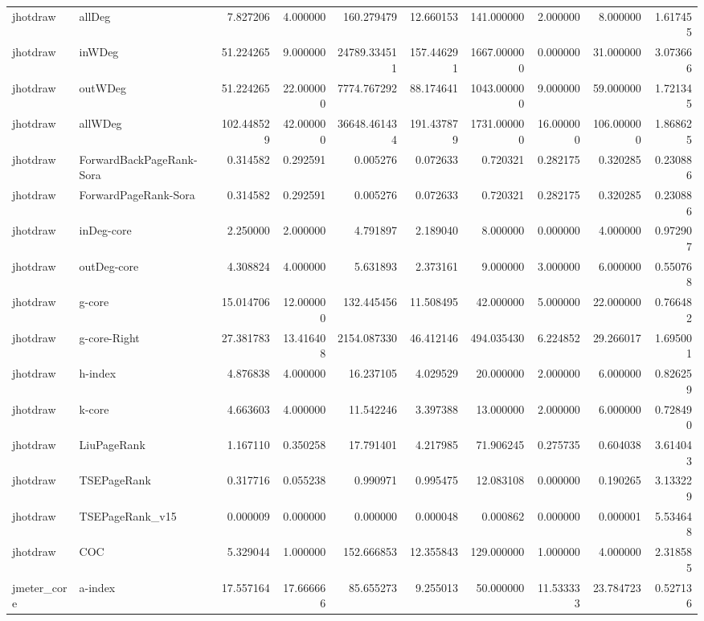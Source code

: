 \begin{tabular}{llrrrrrrrr}
jhotdraw & allDeg & 7.827206 & 4.000000 & 160.279479 & 12.660153 & 141.000000 & 2.000000 & 8.000000 & 1.617455 \\
jhotdraw & inWDeg & 51.224265 & 9.000000 & 24789.334511 & 157.446291 & 1667.000000 & 0.000000 & 31.000000 & 3.073666 \\
jhotdraw & outWDeg & 51.224265 & 22.000000 & 7774.767292 & 88.174641 & 1043.000000 & 9.000000 & 59.000000 & 1.721345 \\
jhotdraw & allWDeg & 102.448529 & 42.000000 & 36648.461434 & 191.437879 & 1731.000000 & 16.000000 & 106.000000 & 1.868625 \\
jhotdraw & ForwardBackPageRank-Sora & 0.314582 & 0.292591 & 0.005276 & 0.072633 & 0.720321 & 0.282175 & 0.320285 & 0.230886 \\
jhotdraw & ForwardPageRank-Sora & 0.314582 & 0.292591 & 0.005276 & 0.072633 & 0.720321 & 0.282175 & 0.320285 & 0.230886 \\
jhotdraw & inDeg-core & 2.250000 & 2.000000 & 4.791897 & 2.189040 & 8.000000 & 0.000000 & 4.000000 & 0.972907 \\
jhotdraw & outDeg-core & 4.308824 & 4.000000 & 5.631893 & 2.373161 & 9.000000 & 3.000000 & 6.000000 & 0.550768 \\
jhotdraw & g-core & 15.014706 & 12.000000 & 132.445456 & 11.508495 & 42.000000 & 5.000000 & 22.000000 & 0.766482 \\
jhotdraw & g-core-Right & 27.381783 & 13.416408 & 2154.087330 & 46.412146 & 494.035430 & 6.224852 & 29.266017 & 1.695001 \\
jhotdraw & h-index & 4.876838 & 4.000000 & 16.237105 & 4.029529 & 20.000000 & 2.000000 & 6.000000 & 0.826259 \\
jhotdraw & k-core & 4.663603 & 4.000000 & 11.542246 & 3.397388 & 13.000000 & 2.000000 & 6.000000 & 0.728490 \\
jhotdraw & LiuPageRank & 1.167110 & 0.350258 & 17.791401 & 4.217985 & 71.906245 & 0.275735 & 0.604038 & 3.614043 \\
jhotdraw & TSEPageRank & 0.317716 & 0.055238 & 0.990971 & 0.995475 & 12.083108 & 0.000000 & 0.190265 & 3.133229 \\
jhotdraw & TSEPageRank_v15 & 0.000009 & 0.000000 & 0.000000 & 0.000048 & 0.000862 & 0.000000 & 0.000001 & 5.534648 \\
jhotdraw & COC & 5.329044 & 1.000000 & 152.666853 & 12.355843 & 129.000000 & 1.000000 & 4.000000 & 2.318585 \\
jmeter_core & a-index & 17.557164 & 17.666666 & 85.655273 & 9.255013 & 50.000000 & 11.533333 & 23.784723 & 0.527136 \\

\end{tabular}

